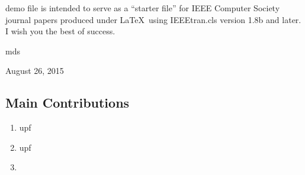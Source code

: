 




% 
% 
% 
% 






 demo file is intended to serve as a ``starter file''
for IEEE Computer Society journal papers produced under \LaTeX\ using
IEEEtran.cls version 1.8b and later.
I wish you the best of success.


\hfill mds

\hfill August 26, 2015






\subsection{Main Contributions}


\begin{enumerate}
    \item  \gls{upf}
    \item   \gls{upf}
    \item   
\end{enumerate}


